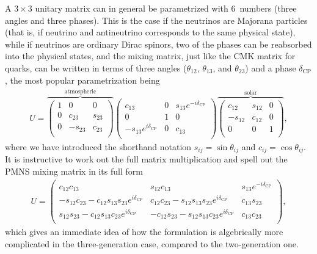 A $3 \times 3$ unitary matrix can in general be parametrized with 6~numbers (three
angles and three phases). This is the case if the neutrinos are Majorana
particles (that is, if neutrino and antineutrino corresponds to the same
physical state), while if neutrinos are ordinary Dirac spinors, two of the phases
can be reabsorbed into the physical states, and the mixing matrix, just like the
CMK matrix for quarks, can be written in terms of three angles ($\theta_{12}$,
$\theta_{13}$, and $\theta_{23}$) and a phase $\delta_\text{CP}$, the most popular
parametrization being
\begin{align}
  U =
  \overbrace{
  \begin{pmatrix}
    1 & 0 & 0\\
    0 & c_{23} & s_{23}\\
    0 & -s_{23} & c_23 \\
  \end{pmatrix}
  }^\text{atmospheric}
  \begin{pmatrix}
    c_{13} & 0 & s_{13} e^{-i\delta_\text{CP}}\\
    0 & 1 & 0\\
    -s_{13} e^{i\delta_\text{CP}} & 0 & c_13\\
  \end{pmatrix}
  \overbrace{
  \begin{pmatrix}
    c_{12} & s_{12} & 0\\
    -s_{12} & c_12 & 0\\
    0 & 0 & 1\\
  \end{pmatrix}
  }^\text{solar},
\end{align}
where we have introduced the shorthand notation $s_{ij} = \sin\theta_{ij}$ and
$c_{ij} = \cos\theta_{ij}$. It is instructive to work out the full matrix multiplication
and spell out the PMNS mixing matrix in its full form
\begin{align}
  U =
  \begin{pmatrix}
    c_{12}c_{13} & s_{12}c_{13} & s_{13} e^{-i\delta_\text{CP}}\\
    -s_{12}c_{23} -c_{12}s_{13}s_{23}e^{i\delta_\text{CP}} &
      c_{12}c_{23} - s_{12}s_{13}s_{23}e^{i\delta_\text{CP}} & c_{13}s_{23}\\
    s_{12}s_{23} - c_{12}s_{13}c_{23}e^{i\delta_\text{CP}} &
      -c_{12}s_{23} - s_{12}s_{13}c_{23}e^{i\delta_\text{CP}} & c_{13}c_{23}\\
  \end{pmatrix},
\end{align}
which gives an immediate idea of how the formulation is algebrically more complicated
in the three-generation case, compared to the two-generation one.

